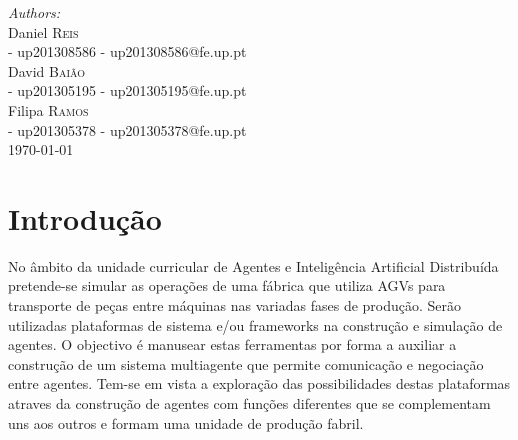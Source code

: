 \begin{titlepage}


\Large \emph{Authors:}\\[0.5cm] \normalsize
Daniel \textsc{Reis}\\[0.1cm] - up201308586 
- up201308586@fe.up.pt\\[0.1cm]
David \textsc{Baião}\\[0.1cm] - up201305195
- up201305195@fe.up.pt\\[0.1cm] 
Filipa \textsc{Ramos}\\[0.1cm] - up201305378
- up201305378@fe.up.pt\\[3cm] %


{\large \today}\\[0cm] %


\tableofcontents


\section{Introdução} 

\justify\normalsize
No âmbito da unidade curricular de Agentes e Inteligência Artificial Distribuída pretende-se simular as operações de uma fábrica que utiliza AGVs para transporte de peças entre máquinas nas variadas fases de produção. Serão utilizadas plataformas de sistema e/ou frameworks na construção e simulação de agentes. O objectivo é manusear estas ferramentas por forma a auxiliar a construção de um sistema multiagente que permite comunicação e negociação entre agentes. Tem-se em vista a exploração das possibilidades destas plataformas atraves da construção de agentes com funções diferentes que se complementam uns aos outros e formam uma unidade de produção fabril.


\end{titlepage}
